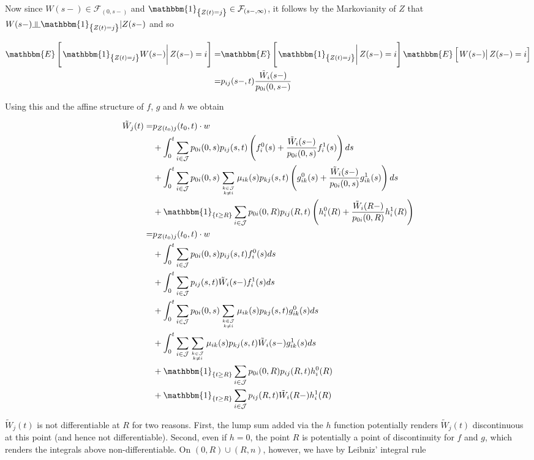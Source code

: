 \documentclass{book}
\newcommand{\indep}{\rotatebox[origin=c]{90}{$\models$}}
\newcommand{\1}[1]{\mathbbm{1}_{\left\lbrace #1 \right\rbrace}}
\newcommand{\econd}[2][def]{\mathbbm{E} \left[ \left. #1 \right| #2 \right]}
\theoremstyle{break}
\theoremstyle{remark}
\numberwithin{equation}{section}
\begin{document}
Now since $W(s-) \in  \mathcal{F}_{\left( 0,s- \right)}$ and $\1{Z(t)=j} \in \mathcal{F}_{\left( s-,\infty \right)}$, it follows by the Markovianity of $Z$ that $W(s-) \indep \1{Z(t)=j} | Z(s-)$ and so

\begin{align*}
	\econd[\1{Z(t)=j}W(s-)]{Z(s-)=i} =& \econd[\1{Z(t)=j}]{Z(s-)=i} \econd[W(s-)]{Z(s-)=i} \\
	=& p_{ij}(s-,t) \frac{\tilde{W}_i(s-)}{p_{0i}(0,s-)}
\end{align*}


Using this and the affine structure of $f$, $g$ and $h$ we obtain

\begin{align}
\tilde{W}_j(t) =& p_{Z(t_0)j}(t_0,t) \cdot w \\
&+ \int_0^t \sum_{i \in \mathcal{J}} p_{0i}(0,s) p_{ij}(s,t) \left( f_i^0(s) + \frac{\tilde{W}_i(s-)}{p_{0i}(0,s)} f_i^1(s) \right) ds \\
&+ \int_0^t \sum_{i \in \mathcal{J}} p_{0i}(0,s) \sum_{k \in \mathcal{J} \atop k \neq i} \mu_{ik}(s) p_{kj}(s,t) \left( g_{ik}^0(s) + \frac{\tilde{W}_i(s-)}{p_{0i}(0,s)} g_{ik}^1(s) \right) ds \\
&+ \1{t \geq R}\sum_{i \in \mathcal{J}} p_{0i}(0,R) p_{ij}(R,t) \left( h_i^0(R) + \frac{\tilde{W}_i(R-)}{p_{0i}(0,R)} h_i^1(R) \right) \\
=& p_{Z(t_0)j}(t_0,t) \cdot w \label{FirstLineA} \\
&+ \int_0^t \sum_{i \in \mathcal{J}} p_{0i}(0,s) p_{ij}(s,t) f_i^0(s) ds \\
&+ \int_0^t \sum_{i \in \mathcal{J}} p_{ij}(s,t) \tilde{W}_i(s-) f_i^1(s) ds \\
&+ \int_0^t \sum_{i \in \mathcal{J}} p_{0i}(0,s) \sum_{k \in \mathcal{J} \atop k \neq i} \mu_{ik}(s) p_{kj}(s,t) g_{ik}^0(s) ds \\
&+ \int_0^t \sum_{i \in \mathcal{J}} \sum_{k \in \mathcal{J} \atop k \neq i} \mu_{ik}(s) p_{kj}(s,t) \tilde{W}_i(s-) g_{ik}^1(s) ds \\
&+ \1{t \geq R}\sum_{i \in \mathcal{J}} p_{0i}(0,R) p_{ij}(R,t) h_i^0(R) \label{FirstGlue} \\
&+ \1{t \geq R}\sum_{i \in \mathcal{J}} p_{ij}(R,t) \tilde{W}_i(R-) h_i^1(R) \label{SecondGlue}
\end{align}

$\tilde{W}_j(t)$ is not differentiable at $R$ for two reasons. First, the lump sum added via the $h$ function potentially renders $\tilde{W}_j(t)$ discontinuous at this point (and hence not differentiable). Second, even if $h=0$, the point $R$ is potentially a point of discontinuity for $f$ and $g$, which renders the integrals above non-differentiable. On $(0,R)\cup(R,n)$, however, we have by Leibniz' integral rule
\end{document}

